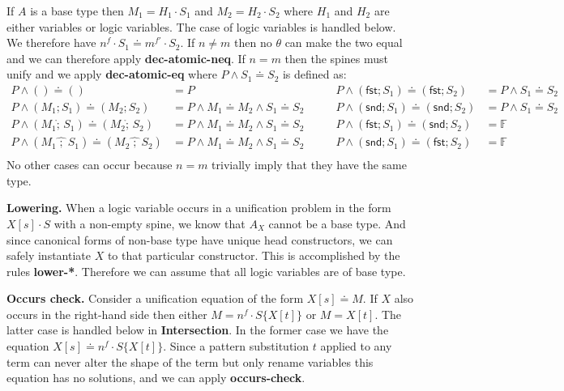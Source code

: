 \documentclass{eptcs}
\newcommand{\lhat}[1]{\widehat{\;#1\;}}
\newcommand\affext{\mathring{;}\,}
\theoremstyle{definition}
\begin{document}
If $A$ is a base type then $M_1=H_1\cdot S_1$ and $M_2=H_2\cdot S_2$
where $H_1$ and $H_2$ are either variables or logic variables.  The case
of logic variables is handled below.  We therefore have
$n^f\cdot S_1\doteq m^{f'}\cdot S_2$.  If $n\neq m$ then no $\theta$
can make the two equal and we can therefore apply
\textbf{dec-atomic-neq}.  If $n=m$ then the
spines must unify and we apply \textbf{dec-atomic-eq} where
$P\land S_1\doteq S_2$ is defined as:
\[
\begin{array}{llll}
P\land ()\doteq () &= P                                                                     & P\land (\textsf{fst}; S_1)\doteq (\textsf{fst}; S_2) &= P\land S_1\doteq S_2 \\
P\land (M_1; S_1)\doteq (M_2; S_2) &= P\land M_1\doteq M_2\land S_1\doteq S_2       \qquad  & P\land (\textsf{snd}; S_1)\doteq (\textsf{snd}; S_2) &= P\land S_1\doteq S_2 \\
P\land (M_1\affext S_1)\doteq (M_2\affext S_2) &= P\land M_1\doteq M_2\land S_1\doteq S_2   & P\land (\textsf{fst}; S_1)\doteq (\textsf{snd}; S_2) &= \mathbb{F} \\
P\land (M_1\lhat{;} S_1)\doteq (M_2\lhat{;} S_2) &= P\land M_1\doteq M_2\land S_1\doteq S_2 & P\land (\textsf{snd}; S_1)\doteq (\textsf{fst}; S_2) &= \mathbb{F} \\
\end{array}
\]
No other cases can occur because $n=m$ trivially imply that
they have the same type.

\medskip \noindent\textbf{Lowering.}
When a logic variable occurs in a unification problem in the form
$X[s]\cdot S$ with a non-empty spine, we know that $A_X$ cannot be a
base type.  And since canonical forms of non-base type have unique head
constructors, we can safely instantiate $X$ to that particular
constructor.  This is accomplished by the rules \textbf{lower-*}.
Therefore we can assume that all logic variables are of base type.

\medskip \noindent\textbf{Occurs check.}
Consider a unification equation of the form $X[s]\doteq M$.  If $X$
also occurs in the right-hand side then either $M=n^f\cdot S\{X[t]\}$ or
$M=X[t]$.  The latter case is handled below in \textbf{Intersection}.
In the former case we have the equation $X[s]\doteq n^f\cdot S\{X[t]\}$.
Since a pattern substitution $t$ applied to any term can never alter the
shape of the term but only rename variables this equation has no
solutions, and we can apply \textbf{occurs-check}.
\end{document}

